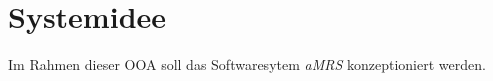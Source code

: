\section{Systemidee}
Im Rahmen dieser \ac{OOA} soll das Softwaresytem \textit{\ac{aMRS}} konzeptioniert werden.